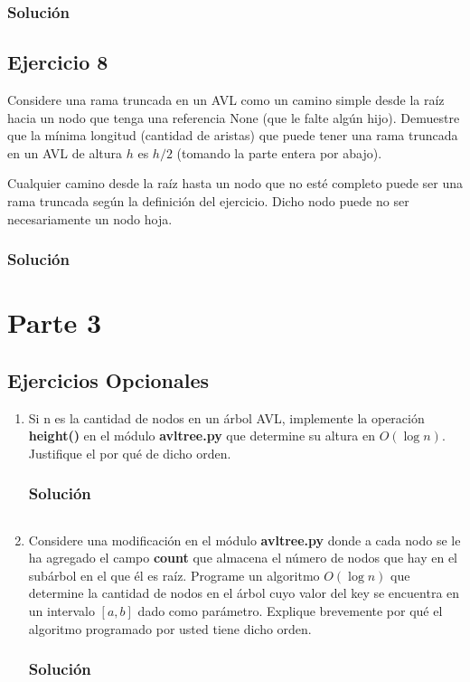 \documentclass{article}
\begin{document}
\subsubsection*{Solución}



\subsection*{Ejercicio 8}
Considere una rama truncada en un AVL como un camino simple desde la raíz hacia un nodo que tenga una referencia None (que le falte algún hijo). Demuestre que la mínima longitud (cantidad de aristas) que puede tener una rama truncada  en un AVL de altura $h$ es $h/2$ (tomando la parte entera por abajo). 

Cualquier camino desde la raíz hasta un nodo que no esté completo puede ser una rama truncada según la definición del ejercicio. Dicho nodo puede no ser necesariamente un nodo hoja.
\subsubsection*{Solución}



\section*{Parte 3}
\subsection*{Ejercicios Opcionales}
\begin{enumerate}
    \item Si n es la cantidad de nodos en un árbol AVL, implemente la operación \textbf{height()} en el módulo \textbf{avltree.py} que determine su altura en $O(\log n)$. Justifique el por qué de dicho orden.
    \subsubsection*{Solución}
    \inputminted{python3}{./code/snippets/ejercicioopcional1.py}
    
    \item Considere una modificación en el módulo \textbf{avltree.py} donde a cada nodo se le ha agregado el campo \textbf{count} que almacena el número de nodos que hay en el subárbol en el que él es raíz. Programe un algoritmo $O(\log n)$ que determine la cantidad de nodos en el árbol cuyo valor del key se encuentra en un intervalo $[a, b]$ dado como parámetro. Explique brevemente por qué el algoritmo programado por usted tiene dicho orden.
    \subsubsection*{Solución}
\end{enumerate}
\end{document}
